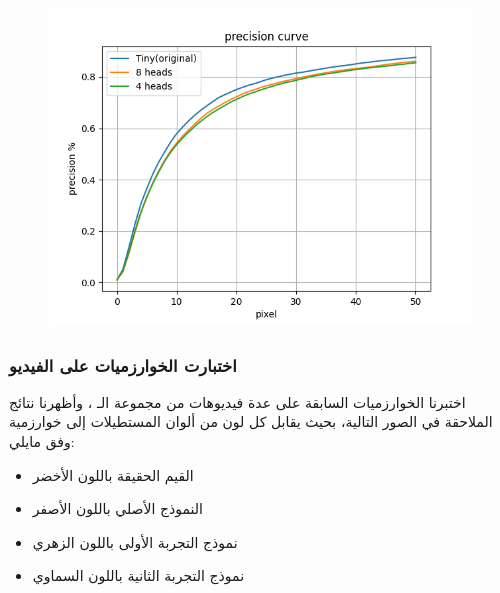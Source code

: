 \vspace{-13.0mm}


\begin{figure}[H]
	\centerline{\includegraphics[width=\textwidth]{charts/precision curve}}
	\caption{}
	\label{fig:precision}
\end{figure}

\subsubsection{اختبارت الخوارزميات على  الفيديو}
اختبرنا الخوارزميات السابقة على عدة فيديوهات من مجموعة الـ 
، 
وأظهرنا نتائج الملاحقة في الصور التالية، بحيث يقابل كل لون من ألوان المستطيلات إلى خوارزمية وفق مايلي:
\begin{itemize}
	\item 	القيم الحقيقة باللون الأخضر
	\item
	النموذج الأصلي 
	باللون الأصفر
	\item
	نموذج التجربة الأولى
	باللون الزهري
	\item
	نموذج التجربة الثانية
	باللون السماوي
\end{itemize}

